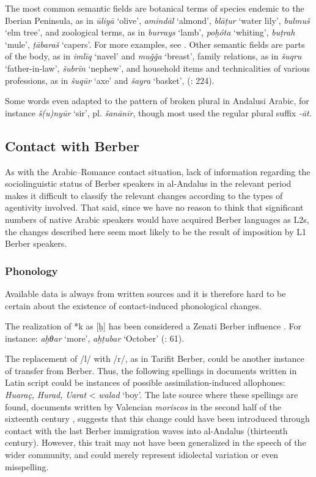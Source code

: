 \documentclass[output=paper,modfonts,nonflat]{langsci/langscibook}
\begin{document}
The most common semantic fields are botanical terms of species endemic to the Iberian Peninsula, as in \textit{ūliyā} ‘olive’, \textit{amindāl} ‘almond’, \textit{blāṭur} ‘water lily’, \textit{bulmuš} ‘elm tree’, and zoological terms, as in \textit{burrays} ‘lamb’, \textit{poḫóta} ‘whiting’, \textit{buṭrah} ‘mule’, \textit{ṭābaraš} ‘capers’. For more examples, see \citet{CorrientePereiraVicente2017}. Other semantic fields are parts of the body, as in \textit{imlīq}  ‘navel’ and \textit{muǧǧa} ‘breast’, family relations, as in \textit{šuqru} ‘father-in-law’, \textit{šubrīn} ‘nephew’, and household items and technicalities of various professions, as in \textit{šuqūr} ‘axe’ and \textit{šayra} ‘basket’, (\citealt{CorrientePereiraVicente2015}: 224). 

Some words even adapted to the pattern of broken plural in Andalusi Arabic, for instance \textit{š(u)nyūr} ‘sir’, pl. \textit{šanānīr}, though most used the regular plural suffix \textit{-āt.}

\subsection{Contact with Berber}

As with the Arabic–Romance contact situation, lack of information regarding the sociolinguistic status of Berber speakers in al-Andalus in the relevant period makes it difficult to classify the relevant changes according to the types of agentivity involved. That said, since we have no reason to think that significant numbers of native Arabic speakers would have acquired Berber languages as L2s, the changes described here seem most likely to be the result of imposition by L1 Berber speakers.

\subsubsection{Phonology}

Available data is always from written sources and it is therefore hard to be certain about the existence of contact-induced phonological changes. 

The realization of *k as [ḫ] has been considered a Zenati Berber influence \citep[7]{Corriente1981}. For instance: \textit{aḫθar} ‘more’, \textit{aḫṭubar} ‘October’ (\citealt{CorrientePereiraVicente2015}: 61).  

The replacement of /l/ with /r/, as in Tarifit Berber, could be another instance of transfer from Berber. Thus, the following spellings in documents written in Latin script could be instances of possible assimilation-induced allophones: \textit{Huaraç,} \textit{Hurad,} \textit{Uarat} < \textit{walad} ‘boy’. The late source where these spellings are found, documents written by Valencian \textit{moriscos} in the second half of the sixteenth century \citep{Labarta1987}, suggests that this change could have been introduced through contact with the last Berber immigration waves into al-Andalus (thirteenth century). However, this trait may not have been generalized in the speech of the wider community, and could merely represent idiolectal variation or even misspelling. 
\end{document}

